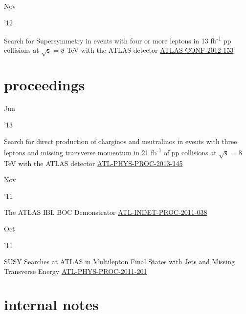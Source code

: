 \documentclass[]{cv} %
\begin{document}
\begin{entrylist}
      \entry
      {\parbox[t]{\parboxWidthOne}{Nov}\parbox[t]{\parboxWidthTwo}{\hfill '12}}
      {Search for Supersymmetry in events with four or more leptons in 13 fb\textsuperscript{-1} pp collisions at $\sqrt{\mathsf{s}}$
    = 8 TeV with the ATLAS detector}
    {\href{https://cds.cern.ch/record/1493492}{ATLAS-CONF-2012-153}}
    {\vspace*{\spacingPubs}}

\end{entrylist}

\section{proceedings}
\begin{entrylist}

\entry
{\parbox[t]{\parboxWidthOne}{Jun}\parbox[t]{\parboxWidthTwo}{\hfill '13}}
{Search for direct production of charginos and neutralinos in events with three leptons and missing transverse momentum in 21
  fb\textsuperscript{-1} of pp collisions at $\sqrt{\mathsf{s}}$ = 8 TeV with the ATLAS detector}
  {\href{https://cds.cern.ch/record/1554811}{ATL-PHYS-PROC-2013-145}}
  {\vspace*{\spacingPubs}}

  \entry
  {\parbox[t]{\parboxWidthOne}{Nov}\parbox[t]{\parboxWidthTwo}{\hfill '11}}
  {The ATLAS IBL BOC Demonstrator}
  {\href{https://cds.cern.ch/record/1401224}{ATL-INDET-PROC-2011-038}}
  {\vspace*{\spacingPubs}}

  \entry
  {\parbox[t]{\parboxWidthOne}{Oct}\parbox[t]{\parboxWidthTwo}{\hfill '11}}
  {SUSY Searches at ATLAS in Multilepton Final States with Jets and Missing Transverse Energy}
  {\href{https://cds.cern.ch/record/1394331}{ATL-PHYS-PROC-2011-201}}
  {\vspace*{\spacingPubs}}

\end{entrylist}

\newpage
\ifinternalNotes
\section{internal notes}
\end{document}
